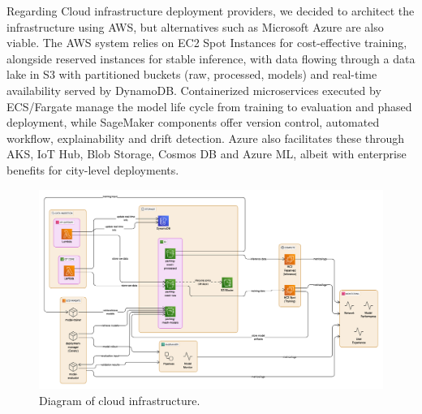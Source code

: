 Regarding Cloud infrastructure deployment providers, we decided to architect the infrastructure using AWS, but alternatives such as Microsoft Azure are also viable. The AWS system relies on EC2 Spot Instances for cost-effective training, alongside reserved instances for stable inference, with data flowing through a data lake in S3 with partitioned buckets (raw, processed, models) and real-time availability served by DynamoDB. Containerized microservices executed by ECS/Fargate manage the model life cycle from training to evaluation and phased deployment, while SageMaker components offer version control, automated workflow, explainability and drift detection. Azure also facilitates these through AKS, IoT Hub, Blob Storage, Cosmos DB and Azure ML, albeit with enterprise benefits for city-level deployments.
\begin{figure}[H]
    \centering
    \includegraphics[width=\linewidth]{Figures/mlops.png} %
    \captionsetup{justification=centering}
    \caption{Diagram of cloud infrastructure.}
    \label{fig:Deployment}
\end{figure}